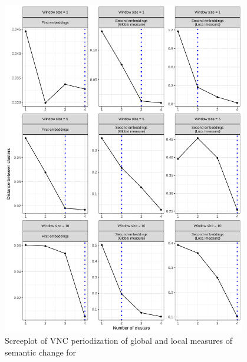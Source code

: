 \begin{figure}[H]
  \centering
  \includegraphics[width=0.95\textwidth]{figures_new/measures/screeplot.pdf}
  \caption{Screeplot of VNC periodization of global and local measures of semantic change for \jia}
\end{figure}

